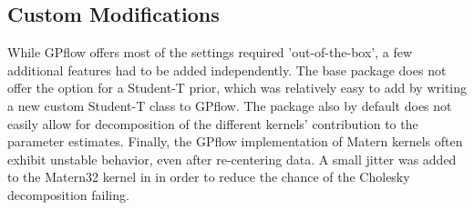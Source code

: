 \subsection{Custom Modifications}

While GPflow offers most of the settings required 'out-of-the-box', a few additional features had to be added independently. The base package does not offer the option for a Student-T prior, which was relatively easy to add by writing a new custom Student-T class to GPflow. The package also by default does not easily allow for decomposition of the different kernels' contribution to the parameter estimates. Finally, the GPflow implementation of Matern kernels often exhibit unstable behavior, even after re-centering data. A small jitter was added to the Matern32 kernel in in order to reduce the chance of the Cholesky decomposition failing. %
